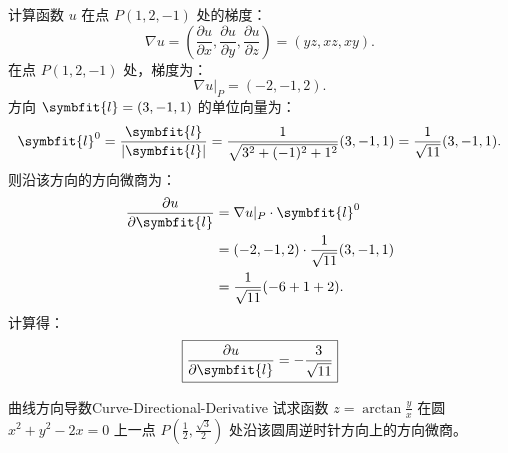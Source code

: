 \begin{solution}
    计算函数 $u$ 在点 $P(1, 2, -1)$ 处的梯度：
    \begin{equation}
        \nabla u = \left( \frac{\partial u}{\partial x}, \frac{\partial u}{\partial y}, \frac{\partial u}{\partial z} \right) = (yz, xz, xy).
    \end{equation}
    在点 $P(1, 2, -1)$ 处，梯度为：
    \begin{equation}
        \nabla u|_{P} = (-2, -1, 2).
    \end{equation}
    方向 $\symbfit{l} = (3, -1, 1)$ 的单位向量为：
    \begin{equation}
        \symbfit{l}^0 = \frac{\symbfit{l}}{|\symbfit{l}|} = \frac{1}{\sqrt{3^2 + (-1)^2 + 1^2}}(3, -1, 1) = \frac{1}{\sqrt{11}}(3, -1, 1).
    \end{equation}
    则沿该方向的方向微商为：
    \begin{equation}
        \begin{aligned}
            \frac{\partial u}{\partial \symbfit{l}} & = \nabla u|_{P} \cdot \symbfit{l}^0               \\
                                                    & = (-2, -1, 2) \cdot \frac{1}{\sqrt{11}}(3, -1, 1) \\
                                                    & = \frac{1}{\sqrt{11}}(-6 + 1 + 2).
        \end{aligned}
    \end{equation}
    计算得：
    \begin{equation}
        \boxed{\frac{\partial u}{\partial \symbfit{l}} = -\frac{3}{\sqrt{11}}}
    \end{equation}
\end{solution}


\begin{problem}{曲线方向导数}{Curve-Directional-Derivative}
    试求函数 $z = \arctan \frac{y}{x}$ 在圆 $x^2 + y^2 - 2x = 0$ 上一点 $P\left(\frac{1}{2}, \frac{\sqrt{3}}{2}\right)$ 处沿该圆周逆时针方向上的方向微商。
\end{problem}

